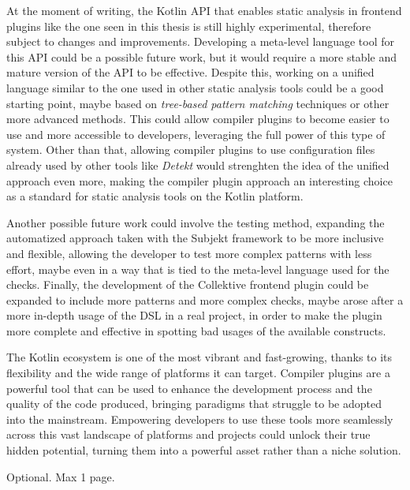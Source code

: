 \documentclass[12pt,a4paper,openright,twoside]{book}
\begin{document}
At the moment of writing, the Kotlin API that enables static analysis in
frontend plugins like the one seen in this thesis is still highly experimental,
therefore subject to changes and improvements. Developing a meta-level language
tool for this API could be a possible future work, but it would require a more
stable and mature version of the API to be effective.
%
Despite this, working on a unified language similar to the one used in other
static analysis tools could be a good starting point, maybe based on
\emph{tree-based pattern matching} techniques or other more advanced methods.
This could allow compiler plugins to become easier to use and more accessible
to developers, leveraging the full power of this type of system. 
%
Other than that, allowing compiler plugins to use configuration files already
used by other tools like \emph{Detekt} would strenghten the idea of the unified
approach even more, making the compiler plugin approach an interesting choice 
as a standard for static analysis tools on the Kotlin platform.

Another possible future work could involve the testing method, expanding the
automatized approach taken with the Subjekt framework to be more inclusive and
flexible, allowing the developer to test more complex patterns with less effort,
maybe even in a way that is tied to the meta-level language used for the checks.
%
Finally, the development of the Collektive frontend plugin could be expanded to
include more patterns and more complex checks, maybe arose after a more in-depth
usage of the \ac{DSL} in a real project, in order to make the plugin more
complete and effective in spotting bad usages of the available constructs.

The Kotlin ecosystem is one of the most vibrant and fast-growing, thanks to its
flexibility and the wide range of platforms it can target. Compiler plugins are
a powerful tool that can be used to enhance the development process and the
quality of the code produced, bringing paradigms that struggle to be adopted
into the mainstream. 
%
Empowering developers to use these tools more seamlessly across this vast
landscape of platforms and projects could unlock their true hidden potential,
turning them into a powerful asset rather than a niche solution.



\backmatter

\nocite{*} %




\begin{acknowledgements} %
Optional. Max 1 page.
\end{acknowledgements}
\end{document}
